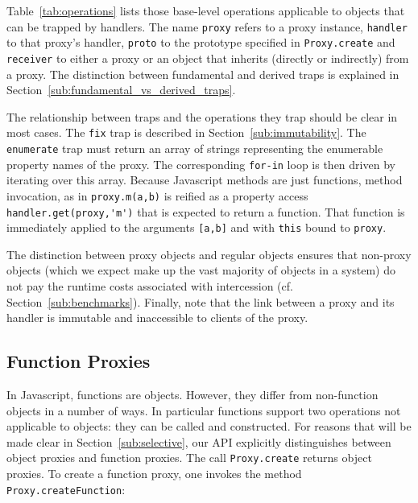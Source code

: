 \documentclass{sig-alternate}
\begin{document}
Table~\ref{tab:operations} lists those base-level operations applicable to objects that can be trapped by handlers. The name \texttt{proxy} refers to a proxy instance, \texttt{handler} to that proxy's handler, \texttt{proto} to the prototype specified in \texttt{Proxy.create} and \texttt{receiver} to either a proxy or an object that inherits (directly or indirectly) from a proxy. The distinction between fundamental and derived traps is explained in Section~\ref{sub:fundamental_vs_derived_traps}.

The relationship between traps and the operations they trap should be clear in most cases. The \texttt{fix} trap is described in Section~\ref{sub:immutability}. The \texttt{enumerate} trap must return an array of strings representing the enumerable property names of the proxy. The corresponding \texttt{for-in} loop is then driven by iterating over this array. Because Javascript methods are just functions, method invocation, as in \lstinline{proxy.m(a,b)} is reified as a property access \lstinline{handler.get(proxy,'m')} that is expected to return a function. That function is immediately applied to the arguments \lstinline{[a,b]} and with \texttt{this} bound to \texttt{proxy}.

The distinction between proxy objects and regular objects ensures that non-proxy objects (which we expect make up the vast majority of objects in a system) do not pay the runtime costs associated with intercession (cf. Section~\ref{sub:benchmarks}). Finally, note that the link between a proxy and its handler is immutable and inaccessible to clients of the proxy.


\subsection{Function Proxies}
\label{sub:funproxies}

In Javascript, functions are objects. However, they differ from non-function objects in a number of ways. In particular functions support two operations not applicable to objects: they can be called and constructed. For reasons that will be made clear in Section~\ref{sub:selective}, our API explicitly distinguishes between object proxies and function proxies. The call \texttt{Proxy.create} returns object proxies. To create a function proxy, one invokes the method \texttt{Proxy.createFunction}:
\end{document}
